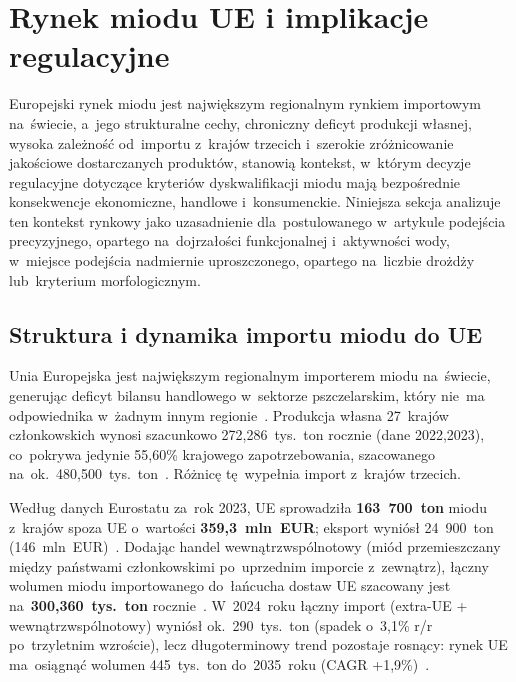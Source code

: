 
\section{Rynek miodu UE i implikacje regulacyjne}

Europejski rynek miodu jest największym regionalnym rynkiem
importowym na~świecie, a~jego strukturalne cechy, chroniczny
deficyt produkcji własnej, wysoka zależność od~importu
z~krajów trzecich i~szerokie zróżnicowanie jakościowe
dostarczanych produktów, stanowią kontekst, w~którym
decyzje regulacyjne dotyczące kryteriów dyskwalifikacji
miodu mają bezpośrednie konsekwencje ekonomiczne, handlowe
i~konsumenckie. Niniejsza sekcja analizuje ten kontekst
rynkowy jako uzasadnienie dla~postulowanego w~artykule
podejścia precyzyjnego, opartego na~dojrzałości funkcjonalnej
i~aktywności wody, w~miejsce podejścia nadmiernie
uproszczonego, opartego na~liczbie drożdży lub~kryterium
morfologicznym.

\subsection{Struktura i dynamika importu miodu do UE}

Unia Europejska jest największym regionalnym importerem
miodu na~świecie, generując deficyt bilansu handlowego
w~sektorze pszczelarskim, który nie~ma odpowiednika
w~żadnym innym regionie~\cite{cbi2024,pollinatorhub2025}.
Produkcja własna 27~krajów członkowskich wynosi szacunkowo
272,286~tys.~ton rocznie (dane 2022,2023), co~pokrywa
jedynie 55,60\% krajowego zapotrzebowania, szacowanego
na~ok.~480,500~tys.~ton~\cite{pollinatorhub2025,ec_honey_autumn2024}.
Różnicę tę~wypełnia import z~krajów trzecich.

Według danych Eurostatu za~rok 2023, UE sprowadziła
\textbf{163~700~ton} miodu z~krajów spoza UE o~wartości
\textbf{359,3~mln~EUR}; eksport wyniósł 24~900~ton
(146~mln~EUR)~\cite{eurostat_honey2023}. Dodając
handel wewnątrzwspólnotowy (miód przemieszczany między
państwami członkowskimi po~uprzednim imporcie z~zewnątrz),
łączny wolumen miodu importowanego do~łańcucha dostaw UE
szacowany jest na~\textbf{300,360~tys.~ton} rocznie~\cite{cbi2024}.
W~2024~roku łączny import (extra-UE + wewnątrzwspólnotowy)
wyniósł ok.~290~tys.~ton (spadek o~3,1\% r/r po~trzyletnim
wzroście), lecz długoterminowy trend pozostaje rosnący:
rynek UE ma~osiągnąć wolumen 445~tys.~ton do~2035~roku
(CAGR +1,9\%)~\cite{eurostat_honey2023}.

